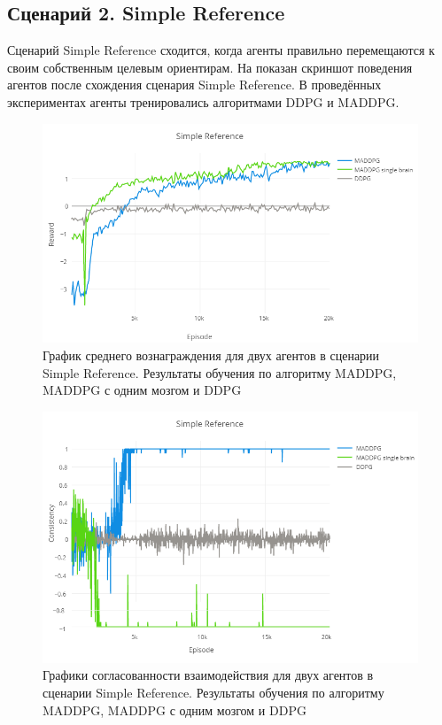 \subsection{Сценарий 2. Simple Reference}

Сценарий Simple Reference сходится, когда агенты правильно перемещаются к своим собственным целевым ориентирам. На  показан скриншот поведения агентов после схождения сценария Simple Reference. В проведённых экспериментах агенты тренировались алгоритмами DDPG и MADDPG.

\begin{figure}[ht!]
    \center
    \includegraphics [scale=0.6] {my_folder/images/ch5/sr-rew.png}
    \caption{График среднего вознаграждения для двух агентов в сценарии Simple Reference. Результаты обучения по алгоритму MADDPG, MADDPG с одним мозгом и DDPG}
    \label{fig:result-sr-rew}
\end{figure}

\begin{figure}[ht!]
    \center
    \includegraphics [scale=0.6] {my_folder/images/ch5/sr-comm.png}
    \caption{Графики согласованности взаимодействия для двух агентов в сценарии Simple Reference. Результаты обучения по алгоритму MADDPG, MADDPG с одним мозгом и DDPG}
    \label{fig:result-sr-comm}
\end{figure}

